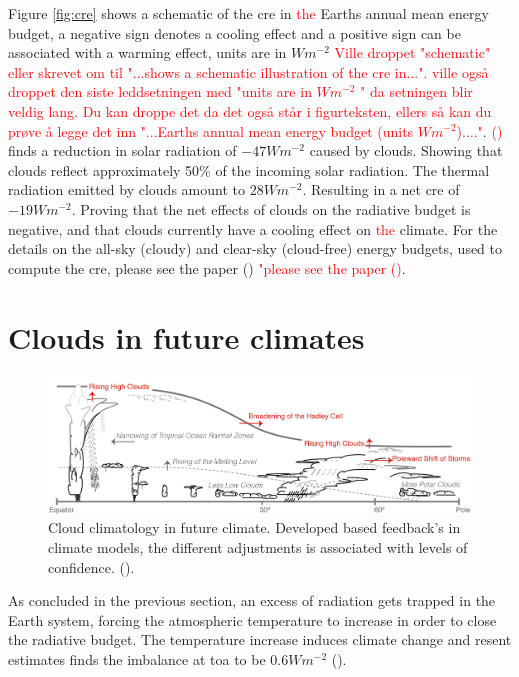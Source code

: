 Figure \ref{fig:cre} shows a schematic of the \acrshort{cre} in \textcolor{red}{the} Earths annual mean energy budget, a negative sign denotes a cooling effect and a positive sign can be associated with a warming effect, units are in $W m^{-2}$ \textcolor{red}{Ville droppet "schematic" eller skrevet om til "...shows a schematic illustration of the \acrshort{cre} in...". ville også droppet den siste leddsetningen med "units are in $W m^{-2}$
" da setningen blir veldig lang. Du kan droppe det da det også står i figurteksten, ellers så kan du prøve å legge det inn "...Earths annual mean energy budget (units $W m^{-2}$)...."}. \citeauthor{Wild2019TheModels} \textcolor{red}{(\citeyear{Wild2019TheModels})} finds a reduction in solar radiation of $-47Wm^{-2}$ caused by clouds. Showing that clouds reflect approximately 50\% of the incoming solar radiation. The thermal radiation emitted by clouds amount to $28Wm^{-2}$. Resulting in a net \acrshort{cre} of $-19Wm^{-2}$. Proving that the net effects of clouds on the radiative budget is negative, and that clouds currently have a cooling effect on \textcolor{red}{the} climate. For the details on the all-sky (cloudy) and clear-sky (cloud-free) energy budgets, used to compute the \acrshort{cre}, please see the paper (\cite{Wild2019TheModels}) \textcolor{red}{"please see the paper \citeauthor{Wild2019TheModels} (\citeyear{Wild2019TheModels})}. %


\section{Clouds in future climates} \label{sec:intro_cloud_future_climates}
\begin{figure}[h]
    \centering
    \includegraphics[scale = 0.8]{Chapter1_Intro/images/Fig7-11_ipcc.jpg}
    \caption{Cloud climatology in future climate. Developed based feedback's in climate models, the different adjustments is associated with levels of confidence.  (\cite{IPCC_CH7_clouds}).}
    \label{fig:cloud_scheme}
\end{figure}
As concluded in the previous section, an excess of radiation gets trapped in the Earth system, forcing the atmospheric temperature to increase in order to close the radiative budget. The temperature increase induces climate change and resent estimates finds the imbalance at \acrshort{toa} to be $0.6 Wm^{-2}$ (\cite{Wild2019TheModels}).

